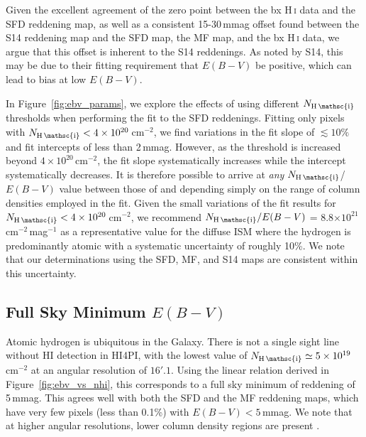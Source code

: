 \documentclass[iop,apj]{emulateapj}
\makeatletter
\def\testbx{bx}%
\DeclareRobustCommand{\ion}[2]{%
\relax\ifmmode
\ifx\testbx\f@series
{\mathbf{#1\,\mathsc{#2}}}\else
{\mathrm{#1\,\mathsc{#2}}}\fi
\else\textup{#1\,{\mdseries\textsc{#2}}}%
\fi}
\makeatother
\begin{document}
Given the excellent agreement of the zero point between the \ion{H}{i} data and the SFD reddening map, as well as a consistent 15-30\,mmag offset found between the S14 reddening map and the SFD map, the MF map, and the \ion{H}{i} data, we argue that this offset is inherent to the S14 reddenings. As noted by S14, this may be due to their fitting requirement that $E(B-V)$ be positive, which can lead to bias at low $E(B-V)$.

In Figure~\ref{fig:ebv_params}, we explore the effects of using different $N_\ion{H}{i}$ thresholds when performing the fit to the SFD reddenings. Fitting only pixels with $N_\ion{H}{i} < 4\times10^{20}$\,cm$^{-2}$, we find variations in the fit slope of $\lesssim10\%$ and fit intercepts of less than 2\,mmag. However, as the threshold is increased beyond $4\times10^{20}$\,cm$^{-2}$, the fit slope systematically increases while the intercept systematically decreases. It is therefore possible to arrive at {\it any} $N_\ion{H}{i}$/$E(B-V)$ value between those of \citet{Bohlin+Savage+Drake_1978} and \citet{Liszt_2014a} depending simply on the range of column densities employed in the fit. Given the small variations of the fit results for $N_\ion{H}{i} < 4\times10^{20}$\,cm$^{-2}$, we recommend $N_\ion{H}{i}/E(B-V)$ = 8.8$\times10^{21}$\,cm$^{-2}$\,mag$^{-1}$ as a representative value for the diffuse ISM where the hydrogen is predominantly atomic with a systematic uncertainty of roughly 10\%. We note that our determinations using the SFD, MF, and S14 maps are consistent within this uncertainty.

\subsection{Full Sky Minimum $E(B-V)$}
Atomic hydrogen is ubiquitous in the Galaxy. There is not a single sight line without HI detection in HI4PI, with the lowest value of $N_\ion{H}{i} \simeq 5\times10^{19}$\,cm$^{-2}$ at an angular resolution of $16'.1$. Using the linear relation derived in Figure~\ref{fig:ebv_vs_nhi}, this corresponds to a full sky minimum of reddening of 5\,mmag. This agrees well with both the SFD and the MF reddening maps, which have very few pixels (less than 0.1\%) with $E(B-V) < 5$\,mmag. We note that at higher angular resolutions, lower column density regions are present \citep[e.g. the Lockman Hole,][]{Lockman+etal_1986}.
\end{document}

